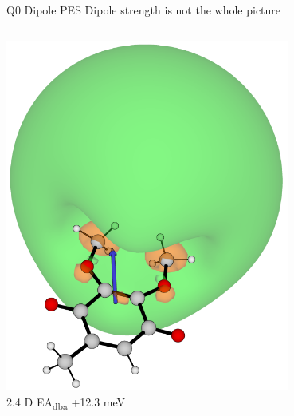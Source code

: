 \documentclass[9pt,t,xcolor=table]{beamer}
\begin{document}
\begin{frame}{\huge Q0 Dipole PES}\large
	Dipole strength is not the whole picture
	\begin{columns}
		\begin{column}{0.5\textwidth}
			\centering
			\includegraphics[width=0.7\textwidth]{Figs/Q0_181.png} \\
			{\textmu} 2.4 D EA\textsubscript{dba} +12.3 meV \\
			

\end{column}
\end{columns}
\end{frame}
\end{document}
